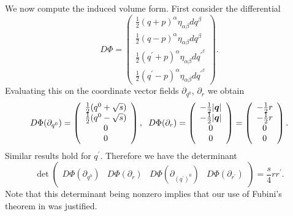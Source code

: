  We now compute the induced volume form.  First consider the differential 
\begin{equation}
 D\Phi=\left( \begin{array}{c}
\frac{1}{2}(q+p)^\alpha\eta_{\alpha\beta}dq^\beta \\
\frac{1}{2}(q-p)^\alpha\eta_{\alpha\beta}dq^\beta\\
\frac{1}{2}(q^{'}+p)^\alpha\eta_{\alpha\beta}dq^{'^\beta}  \\
\frac{1}{2}(q^{'}-p)^\alpha\eta_{\alpha\beta}dq^{'^\beta}  \end{array} \right).
\end{equation}
Evaluating this on the coordinate vector fields $\partial_{q^0}$, $\partial_r$ we obtain
\begin{equation}
 D\Phi(\partial_{q^0})=\left( \begin{array}{c}
\frac{1}{2}(q^0+\sqrt{s}) \\
\frac{1}{2}(q^0-\sqrt{s}) \\
0\\
0 \end{array} \right), \hspace{2mm}  D\Phi(\partial_{r})=\left( \begin{array}{c}
-\frac{1}{2}|\vec{q}| \\
-\frac{1}{2}|\vec{q}| \\
0\\
0 \end{array} \right)=\left( \begin{array}{c}
-\frac{1}{2}r \\
-\frac{1}{2}r \\
0\\
0 \end{array} \right).
\end{equation}
Similar results hold for $q^{'}$.  Therefore we have the determinant
\begin{equation}
\det\left( \begin{array}{cccc}
D\Phi(\partial_{q^0}) & D\Phi(\partial_{r}) & D\Phi(\partial_{(q^{'})^0}) & D\Phi(\partial_{r^{'}}) \end{array} \right)=\frac{s}{4}rr^{'}.
\end{equation}
Note that this determinant being nonzero implies that our use of Fubini's theorem in  was justified.


